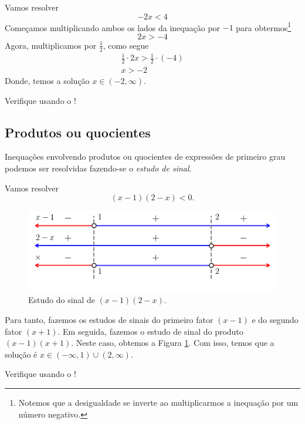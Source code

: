 \begin{ex}
  Vamos resolver
  \begin{equation}
    - 2x < 4
  \end{equation}
  Começamos multiplicando ambos os lados da inequação por $-1$ para obtermos\footnote{Notemos que a desigualdade se inverte ao multiplicarmos a inequação por um número negativo.}
  \begin{equation}
    2x > -4
  \end{equation}
  Agora, multiplicamos por $\frac{1}{2}$, como segue
  \begin{gather}
    \frac{1}{2}\cdot 2x > \frac{1}{2}\cdot (-4)\\
    x > -2
  \end{gather}
  Donde, temos a solução $x\in (-2, \infty)$.

  \begin{ifispython}
    Verifique usando o {\sympy}!
  \end{ifispython}
\end{ex}

\subsection{Produtos ou quocientes}

Inequações envolvendo produtos ou quocientes de expressões de primeiro grau podemos ser resolvidas fazendo-se o \emph{estudo de sinal}.

\begin{ex}
  Vamos resolver
  \begin{equation}
    (x - 1)(2 - x) < 0.
  \end{equation}
  
  \begin{figure}[H]
    \centering
    \includegraphics{./cap_ineq/dados/fig_ex_ineq_pg1/fig}
    \caption{Estudo do sinal de $(x-1)(2-x)$.}
    \label{fig:ex_ineq_pg1}
  \end{figure}  

  Para tanto, fazemos os estudos de sinais do primeiro fator $(x-1)$ e do segundo fator $(x+1)$. Em seguida, fazemos o estudo de sinal do produto $(x-1)(x+1)$. Neste caso, obtemos a Figura \ref{fig:ex_ineq_pg1}. Com isso, temos que a solução é $x\in (-\infty, 1)\cup (2, \infty)$.

  \begin{ifispython}
    Verifique usando o {\sympy}!
  \end{ifispython}
\end{ex}

